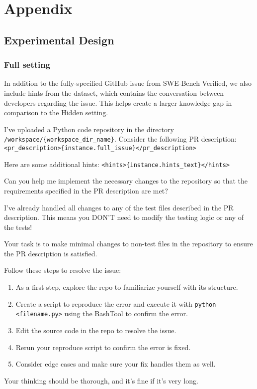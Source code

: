 \section{Appendix}
\label{sec:appendix}
\subsection{Experimental Design}
\subsubsection{Full setting}
In addition to the fully-specified GitHub issue from SWE-Bench Verified, we also include hints from the dataset, which contains the conversation between developers regarding the issue. This helps create a larger knowledge gap in comparison to the Hidden setting.
\begin{tcolorbox}[colback=gray!5!white, colframe=gray!75!black, title=Prompt for Full Setting, boxrule=0.8mm, top=2mm, bottom=2mm, left=2mm, right=2mm, sharp corners]
I’ve uploaded a Python code repository in the directory \texttt{/workspace/\{workspace\_dir\_name\}}. Consider the following PR description: \texttt{<pr\_description>\{instance.full\_issue\}</pr\_description>}

Here are some additional hints: \texttt{<hints>\{instance.hints\_text\}</hints>}

Can you help me implement the necessary changes to the repository so that the requirements specified in the PR description are met?

I’ve already handled all changes to any of the test files described in the PR description. This means you DON’T need to modify the testing logic or any of the tests!

Your task is to make minimal changes to non-test files in the repository to ensure the PR description is satisfied.

Follow these steps to resolve the issue:

\begin{enumerate}
    \item As a first step, explore the repo to familiarize yourself with its structure.
    \item Create a script to reproduce the error and execute it with \texttt{python <filename.py>} using the BashTool to confirm the error.
    \item Edit the source code in the repo to resolve the issue.
    \item Rerun your reproduce script to confirm the error is fixed.
    \item Consider edge cases and make sure your fix handles them as well.
\end{enumerate}

Your thinking should be thorough, and it’s fine if it’s very long.
\end{tcolorbox}

